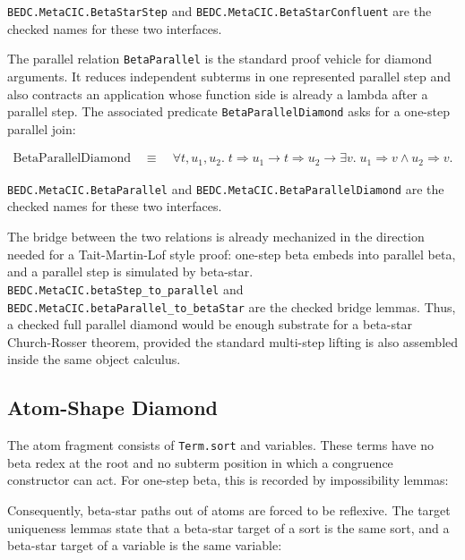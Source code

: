 \texttt{BEDC.MetaCIC.BetaStarStep} and
\texttt{BEDC.MetaCIC.BetaStarConfluent} are the checked names for these two
interfaces.

The parallel relation \texttt{BetaParallel} is the standard proof vehicle for
diamond arguments. It reduces independent subterms in one represented parallel
step and also contracts an application whose function side is already a lambda
after a parallel step. The associated predicate \texttt{BetaParallelDiamond}
asks for a one-step parallel join:

$$
\begin{aligned}
\mathrm{BetaParallelDiamond}
\quad\equiv\quad
\forall t,u_1,u_2.\;
t \Rightarrow u_1
\to t \Rightarrow u_2
\to \exists v.\;
u_1 \Rightarrow v
\land
u_2 \Rightarrow v .
\end{aligned}
$$

\texttt{BEDC.MetaCIC.BetaParallel} and
\texttt{BEDC.MetaCIC.BetaParallelDiamond} are the checked names for these two
interfaces.

The bridge between the two relations is already mechanized in the direction
needed for a Tait-Martin-Lof style proof: one-step beta embeds into parallel
beta, and a parallel step is simulated by beta-star.
\texttt{BEDC.MetaCIC.betaStep\_to\_parallel} and
\texttt{BEDC.MetaCIC.betaParallel\_to\_betaStar} are the checked bridge
lemmas.
Thus, a checked full parallel diamond would be enough substrate for a
beta-star Church-Rosser theorem, provided the standard multi-step lifting is
also assembled inside the same object calculus.

\subsection{Atom-Shape Diamond}
\label{subsec:metacic-atom-shape-diamond}

The atom fragment consists of \texttt{Term.sort} and variables. These terms
have no beta redex at the root and no subterm position in which a congruence
constructor can act. For one-step beta, this is recorded by impossibility
lemmas:

Consequently, beta-star paths out of atoms are forced to be reflexive. The
target uniqueness lemmas state that a beta-star target of a sort is the same
sort, and a beta-star target of a variable is the same variable:

